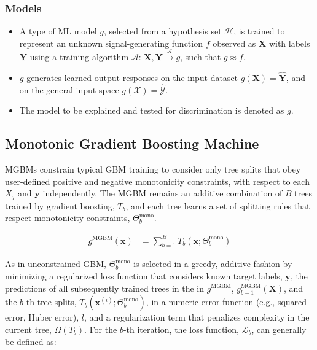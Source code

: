 \documentclass[information,article,submit,moreauthors,pdftex]{definitions/mdpi}
\begin{document}
\subsubsection{Models}

\begin{itemize}[leftmargin=*,labelsep=5.8mm]
	\item A type of ML model $g$, selected from a hypothesis set $\mathcal{H}$, is trained to represent an unknown signal-generating function $f$ observed as  $\mathbf{X}$ with labels $\mathbf{Y}$ using a training algorithm $\mathcal{A}$: 
	$ \mathbf{X}, \mathbf{Y} \xrightarrow{\mathcal{A}} g$, such that $g \approx f$.
	\item $g$ generates learned output responses on the input dataset $g(\mathbf{X}) = \mathbf{\hat{Y}}$, and on the general input space $g(\mathcal{X}) = \mathcal{\hat{Y}}$.
	\item The model to be explained and tested for discrimination is denoted as $g$.
\end{itemize}

\subsection{Monotonic Gradient Boosting Machine}\label{a_ssec:mgbm}

MGBMs constrain typical GBM training to consider only tree splits that obey user-defined positive and negative monotonicity constraints, with respect to each $X_j$ and $\mathbf{y}$ independently. The MGBM remains an additive combination of $B$ trees trained by gradient boosting, $T_b$, and each tree learns a set of splitting rules that respect monotonicity constraints,  $\Theta^\text{mono}_b$. 

\begin{equation}
\begin{aligned}\label{eq:gbm}
g^{\text{MGBM}}(\mathbf{x}) &= \sum_{b=1}^B T_b\left(\mathbf{x}; \Theta^\text{mono}_b\right)
\end{aligned}
\end{equation}

\noindent As in unconstrained GBM, $\Theta^{\text{mono}}_b$ is selected in a greedy, additive fashion by minimizing a regularized loss function that considers known target labels, $\mathbf{y}$, the predictions of all subsequently trained trees in the in $g^{\text{MGBM}}$, $g^{\text{MGBM}}_{b-1}(\mathbf{X})$, and the $b$-th tree splits, $T_b(\mathbf{x}^{(i)};\Theta^\text{mono}_b)$, in a numeric error function (e.g., squared error, Huber error), $l$, and a regularization term that penalizes complexity in the current tree, $\Omega(T_b)$. For the $b$-th iteration, the loss function, $\mathcal{L}_{b}$, can generally be defined as:
\end{document}
